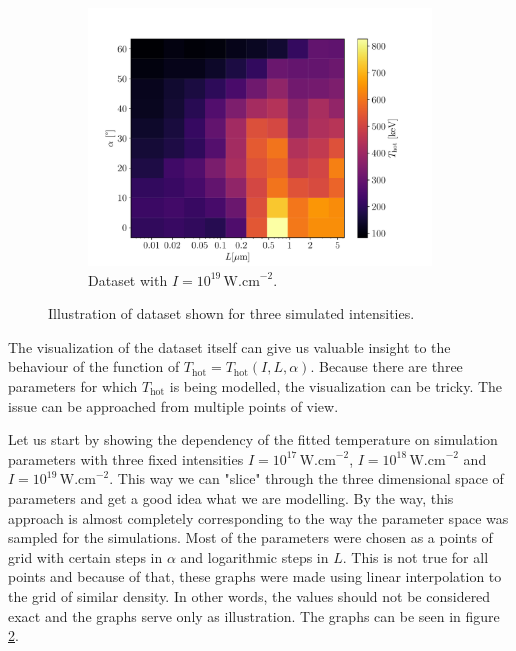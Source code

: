 \begin{figure}[ht]
\begin{subfigure}{0.49\textwidth}
		\includegraphics[width=\textwidth]{figures/I_1e19t_hot}
		\caption{Dataset with $I = 10^{19} \, \mathrm{W.cm}^{-2}$.}
		\label{fig:dataset1-c}
	\end{subfigure}
	\caption{Illustration of dataset shown for three simulated intensities.}
	\label{fig:dataset1}
\end{figure}


The visualization of the dataset itself can give us valuable insight to the behaviour of the function of $T_{\mathrm{hot}} = T_{\mathrm{hot}}(I,L,\alpha)$. Because there are three parameters for which $T_{\mathrm{hot}}$ is being modelled, the visualization can be tricky. The issue can be approached from multiple points of view.

Let us start by showing the dependency of the fitted temperature on simulation parameters with three fixed intensities $I = 10^{17} \,\mathrm{W.cm}^{-2}$, $I = 10^{18} \,\mathrm{W.cm}^{-2}$ and $I = 10^{19} \,\mathrm{W.cm}^{-2}$. This way we can "slice" through the three dimensional space of parameters and get a good idea what we are modelling. By the way, this approach is almost completely corresponding to the way the parameter space was sampled for the simulations. Most of the parameters were chosen as a points of grid with certain steps in $\alpha$ and logarithmic steps in $L$. This is not true for all points and because of that, these graphs were made using linear interpolation to the grid of similar density. In other words, the values should not be considered exact and the graphs serve only as illustration. The graphs can be seen in figure \ref{fig:dataset1}.


